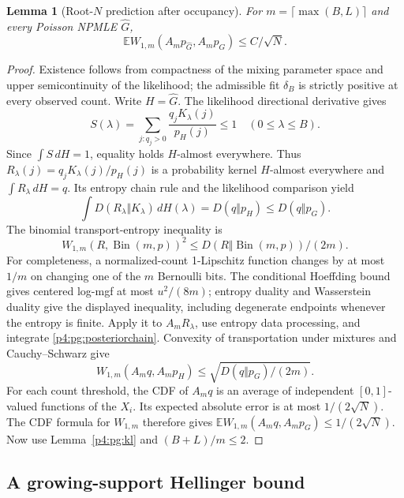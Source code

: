 \documentclass[11pt,a4paper]{article}
\newtheorem{lemma}[theorem]{Lemma}
\theoremstyle{definition}
\theoremstyle{remark}
\numberwithin{equation}{section}
\begin{document}
\begin{lemma}[Root-$N$ prediction after occupancy]\label{p4:pg:transport}
For $m=\lceil\max(B,L)\rceil$ and every Poisson NPMLE $\widehat G$,
\begin{equation}\label{p4:pg:transportbound}
       \mathbb E W_{1,m}(A_mp_{\widehat G},A_mp_G)\le C/\sqrt N.
\end{equation}
\end{lemma}
\begin{proof}
Existence follows from compactness of the mixing parameter space
and upper semicontinuity of the likelihood; the admissible fit
$\delta_B$ is strictly positive at every observed count.  Write
$H=\widehat G$.  The likelihood directional derivative gives
\[
 S(\lambda)=\sum_{j:q_j>0}\frac{q_jK_\lambda(j)}{p_H(j)}\le1
                    \quad(0\le\lambda\le B).
\]
Since $\int S\,dH=1$, equality holds $H$-almost everywhere.
Thus $R_\lambda(j)=q_jK_\lambda(j)/p_H(j)$ is a probability kernel
$H$-almost everywhere and $\int R_\lambda\,dH=q$.  Its entropy
chain rule and the likelihood comparison yield
\begin{equation}\label{p4:pg:posteriorchain}
 \int D(R_\lambda\Vert K_\lambda)\,dH(\lambda)
       =D(q\Vert p_H)\le D(q\Vert p_G).
\end{equation}
The binomial transport-entropy inequality is
\[
 W_{1,m}(R,\operatorname{Bin}(m,p))^2
          \le D(R\Vert\operatorname{Bin}(m,p))/(2m).
\]
For completeness, a normalized-count 1-Lipschitz function changes
by at most $1/m$ on changing one of the $m$ Bernoulli bits.
The conditional Hoeffding bound gives centered log-mgf at most
$u^2/(8m)$; entropy duality and Wasserstein duality give the
displayed inequality, including degenerate endpoints whenever the
entropy is finite.  Apply it to $A_mR_\lambda$, use entropy data
processing, and integrate \eqref{p4:pg:posteriorchain}.  Convexity of
transportation under mixtures and Cauchy--Schwarz give
\[
 W_{1,m}(A_mq,A_mp_H)
                  \le\sqrt{D(q\Vert p_G)/(2m)}.
\]
For each count threshold, the CDF of $A_mq$ is an average of
independent $[0,1]$-valued functions of the $X_i$.  Its expected
absolute error is at most $1/(2\sqrt N)$.  The CDF formula for
$W_{1,m}$ therefore gives
$\mathbb E W_{1,m}(A_mq,A_mp_G)\le1/(2\sqrt N)$.
Now use Lemma~\ref{p4:pg:kl} and $(B+L)/m\le2$.
\end{proof}

\subsection{A growing-support Hellinger bound}
\end{document}
